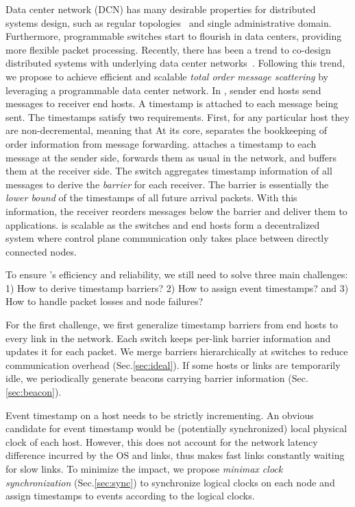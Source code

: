 Data center network (DCN) has many desirable properties for distributed systems design, such as regular topologies~\cite{leiserson1985fat,greenberg2009vl2} and single administrative domain.
Furthermore, programmable switches start to flourish in data centers, providing more flexible packet processing.
Recently, there has been a trend to co-design distributed systems with underlying data center networks~\cite{eris,netcache-sosp17,dang2016paxos}.
Following this trend, we propose \sys to achieve efficient and scalable \textit{total order message scattering} by leveraging a programmable data center network.
In \sys, sender end hosts send messages to receiver end hosts. A timestamp is attached to each message being sent. The timestamps satisfy two requirements. First, for any particular host they are non-decremental, meaning that 
At its core, \sys separates the bookkeeping of order information from message forwarding.
\sys attaches a timestamp to each message at the sender side, forwards them as usual in the network, and buffers them at the receiver side.
The switch aggregates timestamp information of all messages to derive the \textit{barrier} for each receiver.
The barrier is essentially the \textit{lower bound} of the timestamps of all future arrival packets.
With this information, the receiver reorders messages below the barrier and deliver them to applications.
\sys is scalable as the switches and end hosts form a decentralized system where control plane communication only takes place between directly connected nodes.

To ensure \sys's efficiency and reliability, we still need to solve three main challenges: 1) How to derive timestamp barriers? 2) How to assign event timestamps? and 3) How to handle packet losses and node failures?

For the first challenge, we first generalize timestamp barriers from end hosts to every link in the network.
Each switch keeps per-link barrier information and updates it for each packet.
We merge barriers hierarchically at switches to reduce communication overhead (Sec.\ref{sec:ideal}).
If some hosts or links are temporarily idle, we periodically generate beacons carrying barrier information (Sec.\ref{sec:beacon}).


Event timestamp on a host needs to be strictly incrementing.
An obvious candidate for event timestamp would be (potentially synchronized) local physical clock of each host.
However, this does not account for the network latency difference incurred by the OS and links, thus makes fast links constantly waiting for slow links.
To minimize the impact, we propose \textit{minimax clock synchronization} (Sec.\ref{sec:sync}) to synchronize logical clocks on each node and assign timestamps to events according to the logical clocks.

